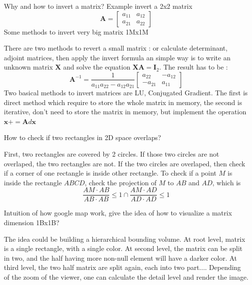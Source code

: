\documentclass[answers]{exam}
\newcommand{\mathvec}[1]{\textbf{#1}}
\begin{document}
\begin{questions}
\question Why and how to invert a matrix? Example invert a 2x2 matrix 
\[
\mathvec{A}=
\left[ 
\begin{array}{cc}
a_{11} & a_{12}\\
a_{21} & a_{22}
\end{array} 
\right]
\]
Some methods to invert very big matrix 1Mx1M
\begin{solution}[.2in]
There are two methods to revert a small matrix : or calculate determinant, adjoint matrices, then apply the invert formula an simple way is to write an unknown matrix $\mathvec{X}$ and solve the equation $\mathvec{X}\mathvec{A}=\mathvec{I}_2$. The result has to be :
\[
\mathvec{A}^{-1}=
\frac{1}{a_{11}a_{22}-a_{12}a_{21}}
\left[ 
\begin{array}{cc}
a_{22} & -a_{12}\\
-a_{21} & a_{11}
\end{array} 
\right]
\]
Two basical methods to invert matrices are LU, Conjugated Gradient. The first is direct method which require to store the whole matrix in memory, the second is iterative, don't need to store the matrix in memory, but implement the operation $\mathvec{x}+=\mathvec{A}d\mathvec{x}$
\end{solution}

\question How to check if two rectangles in 2D space overlaps?
\begin{solution}[.2in]
First, two rectangles are covered by 2 circles. If those two circles are not overlaped, the two rectangles are not. If the two circles are overlaped, then check if a corner of one rectangle is inside other rectangle. To check if a point $M$ is inside the rectangle $ABCD$, check the projection of $M$ to $AB$ and $AD$, which is 
\[
\frac{AM \cdot AB}{AB \cdot AB} \leq 1  
\cap 
\frac{AM \cdot AD}{AD \cdot AD} \leq 1  
\]
\end{solution}

\question Intuition of how google map work, give the idea of how to visualize a matrix dimension 1Bx1B?
\begin{solution}[.2in]
The idea could be building a hierarchical bounding volume. At root level, matrix is a single rectangle, with a single color. At second level, the matrix can be split in two, and the half having more non-null element will have a darker color. At third level, the two half matrix are split again, each into two part.... Depending of the zoom of the viewer, one can calculate the detail level and render the image.
\end{solution}


\end{questions}
\end{document}
